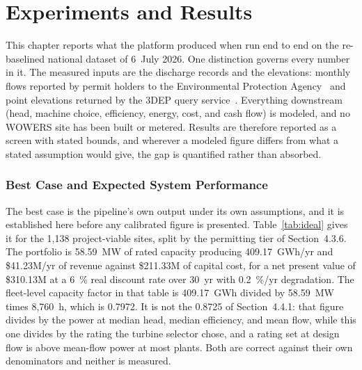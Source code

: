 \documentclass[12pt,letterpaper]{report}
\begin{document}
\chapter{Experiments and Results}
\setcounter{subsection}{0}

This chapter reports what the platform produced when run end to end on the
re-baselined national dataset of 6~July 2026. One distinction governs every number
in it. The measured inputs are the discharge records and the elevations: monthly
flows reported by permit holders to the Environmental Protection
Agency~\cite{epa_echo} and point elevations returned by the 3DEP query
service~\cite{usgs_3dep}. Everything downstream (head, machine choice,
efficiency, energy, cost, and cash flow) is modeled, and no WOWERS site has
been built or metered. Results are therefore reported as a screen with stated
bounds, and wherever a modeled figure differs from what a stated assumption
would give, the gap is quantified rather than absorbed.

\subsection{Best Case and Expected System Performance}   %

The best case is the pipeline's own output under its own assumptions, and it is
established here before any calibrated figure is presented. Table~\ref{tab:ideal}
gives it for the 1{,}138 project-viable sites, split by the permitting tier of
Section~4.3.6. The portfolio is 58.59~MW of rated capacity producing
409.17~GWh/yr and \$41.23M/yr of revenue against \$211.33M of capital cost, for a
net present value of \$310.13M at a 6~\% real discount rate over 30~yr with
0.2~\%/yr degradation. The fleet-level capacity factor in that table is
409.17~GWh divided by 58.59~MW times 8{,}760~h, which is 0.7972. It is not the
0.8725 of Section~4.4.1: that figure divides by the power at median head,
median efficiency, and mean flow, while this one divides by the rating the turbine
selector chose, and a rating set at design flow is above mean-flow power at most
plants. Both are correct against their own denominators and neither is measured.
\end{document}
